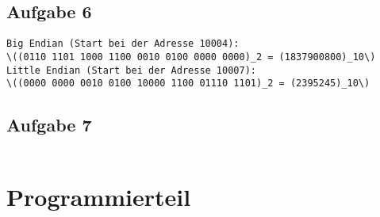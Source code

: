 \documentclass[a4paper,abstracton]{scrartcl}
\begin{document}
\subsection{Aufgabe 6}
\begin{lstlisting}[caption=Dezimalwert]
Big Endian (Start bei der Adresse 10004):
\((0110 1101 1000 1100 0010 0100 0000 0000)_2 = (1837900800)_10\)
Little Endian (Start bei der Adresse 10007):
\((0000 0000 0010 0100 10000 1100 01110 1101)_2 = (2395245)_10\)
\end{lstlisting}

\subsection{Aufgabe 7}
\begin{lstlisting}[caption=Dezimalwert]

\end{lstlisting}


\section{Programmierteil}

\newpage

\end{document}

